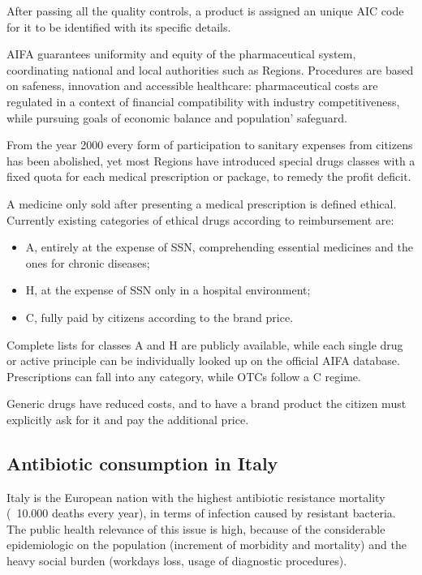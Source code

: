 After passing all the quality controls, a product is assigned an unique AIC code for it to be identified with its specific details.

AIFA guarantees uniformity and equity of the pharmaceutical system, coordinating national and local authorities such as Regions. Procedures are based on safeness, innovation and accessible healthcare: pharmaceutical costs are regulated in a context of financial compatibility with industry competitiveness, while pursuing goals of economic balance and population' safeguard.

From the year 2000 every form of participation to sanitary expenses from citizens has been abolished\cite{ticket}, yet most Regions have introduced special drugs classes with a fixed quota for each medical prescription or package, to remedy the profit deficit. 

A medicine only sold after presenting a medical prescription is defined ethical. Currently existing categories of ethical drugs according to reimbursement are\cite{classi}:
\begin{itemize}
	\item A, entirely at the expense of SSN, comprehending essential medicines and the ones for chronic diseases;
	\item H, at the expense of SSN only in a hospital environment;
	\item C, fully paid by citizens according to the brand price.
\end{itemize}
Complete lists for classes A and H are publicly available, while each single drug or active principle can be individually looked up on the official AIFA database. Prescriptions can fall into any category, while OTCs follow a C regime. 

Generic drugs have reduced costs, and to have a brand product the citizen must explicitly ask for it and pay the additional price\cite{ticket}.

\subsection{Antibiotic consumption in Italy}
Italy is the European nation with the highest antibiotic resistance mortality (~10.000 deaths every year), in terms of infection caused by resistant bacteria\cite{repubblica}. The public health relevance of this issue is high, because of the considerable epidemiologic on the population (increment of morbidity and mortality) and the heavy social burden (workdays loss, usage of diagnostic procedures)\cite{aifa2017}.

